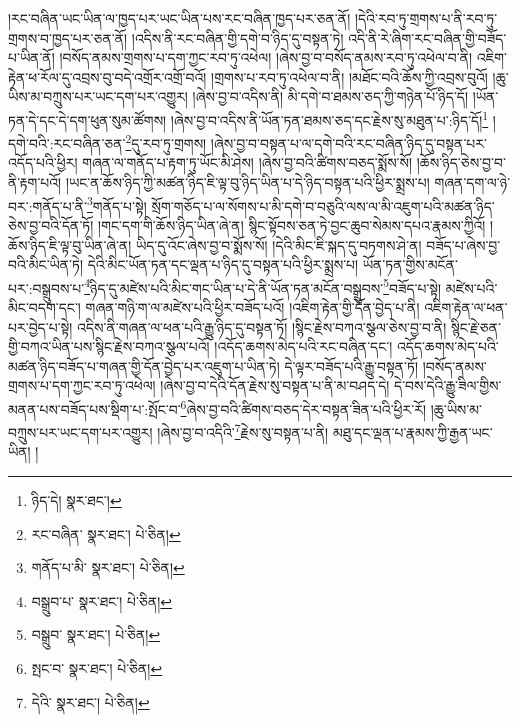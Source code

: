 །རང་བཞིན་ཡང་ཡིན་ལ་ཁྱད་པར་ཡང་ཡིན་པས་རང་བཞིན་ཁྱད་པར་ཅན་ནོ། །དེའི་རབ་ཏུ་གྲགས་པ་ནི་རབ་ཏུ་གྲགས་བ་ཁྱད་པར་ཅན་ནོ། །འདིས་ནི་རང་བཞིན་གྱི་དགེ་བ་ཉིད་དུ་བསྟན་ཏེ། འདི་ནི་རེ་ཞིག་རང་བཞིན་གྱི་བཟོད་པ་ཡིན་ནོ། །བསོད་ནམས་གྲགས་པ་དག་ཀྱང་རབ་ཏུ་འཕེལ། །ཞེས་བྱ་བ་བསོད་ནམས་རབ་ཏུ་འཕེལ་བ་ནི། འཇིག་རྟེན་ཕ་རོལ་དུ་འབྲས་བུ་བདེ་འགྲོར་འགྲོ་བའོ། །གྲགས་པ་རབ་ཏུ་འཕེལ་བ་ནི། །མཐོང་བའི་ཆོས་ཀྱི་འབྲས་བུའོ། །ཆུ་ཡིས་མ་བཀྲུས་པར་ཡང་དག་པར་འགྱུར། །ཞེས་བྱ་བ་འདིས་ནི། མི་དགེ་བ་ཐམས་ཅད་ཀྱི་གཉེན་པོ་ཉིད་དོ། །ཡོན་ཏན་དེ་དང་དེ་དག་ཕུན་སུམ་ཚོགས། །ཞེས་བྱ་བ་འདིས་ནི་ཡོན་ཏན་ཐམས་ཅད་དང་རྗེས་སུ་མཐུན་པ་:ཉིད་དོ།\footnote{ཉིད་དེ།  སྣར་ཐང་། } །དགེ་བའི་:རང་བཞིན་ཅན་\footnote{རང་བཞིན་  སྣར་ཐང་།  པེ་ཅིན། }དུ་རབ་ཏུ་གྲགས། །ཞེས་བྱ་བ་བསྟན་པ་ལ་དགེ་བའི་རང་བཞིན་ཉིད་དུ་བསྟན་པར་འདོད་པའི་ཕྱིར། གཞན་ལ་གནོད་པ་རྟག་ཏུ་ཡོང་མི་ཤེས། །ཞེས་བྱ་བའི་ཚིགས་བཅད་སྨོས་སོ། །ཆོས་ཉིད་ཅེས་བྱ་བ་ནི་རྟག་པའོ། །ཡང་ན་ཆོས་ཉིད་ཀྱི་མཚན་ཉིད་ཇི་ལྟ་བུ་ཉིད་ཡིན་པ་དེ་ཉིད་བསྟན་པའི་ཕྱིར་སྨྲས་པ། གཞན་དག་ལ་ཉེ་བར་:གནོད་པ་ནི་\footnote{གནོད་པ་མི་  སྣར་ཐང་།  པེ་ཅིན། }གནོད་པ་སྟེ། སྲོག་གཅོད་པ་ལ་སོགས་པ་མི་དགེ་བ་བཅུའི་ལས་ལ་མི་འཇུག་པའི་མཚན་ཉིད་ཅེས་བྱ་བའི་དོན་ཏོ། །གང་དག་གི་ཆོས་ཉིད་ཡིན་ཞེ་ན། སྙིང་སྟོབས་ཅན་ཏེ་བྱང་ཆུབ་སེམས་དཔའ་རྣམས་ཀྱིའོ། །ཆོས་ཉིད་ཇི་ལྟ་བུ་ཡིན་ཞེ་ན། ཡིད་དུ་འོང་ཞེས་བྱ་བ་སྨོས་སོ། །དེའི་མིང་ཇི་སྐད་དུ་བཏགས་ཤེ་ན། བཟོད་པ་ཞེས་བྱ་བའི་མིང་ཡིན་ཏེ། དེའི་མིང་ཡོན་ཏན་དང་ལྡན་པ་ཉིད་དུ་བསྟན་པའི་ཕྱིར་སྨྲས་པ། ཡོན་ཏན་གྱིས་མངོན་པར་:བསྒྲུབས་པ་\footnote{བསྒྲུབ་པ་  སྣར་ཐང་།  པེ་ཅིན། }ཉིད་དུ་མཛེས་པའི་མིང་གང་ཡིན་པ་དེ་ནི་ཡོན་ཏན་མངོན་བསྒྲུབས་\footnote{བསྒྲུབ་  སྣར་ཐང་།  པེ་ཅིན། }བཟོད་པ་སྟེ། མཛེས་པའི་མིང་བདག་དང་། གཞན་གཉི་ག་ལ་མཛེས་པའི་ཕྱིར་བཟོད་པའོ། །འཇིག་རྟེན་གྱི་དོན་བྱེད་པ་ནི། འཇིག་རྟེན་ལ་ཕན་པར་བྱེད་པ་སྟེ། འདིས་ནི་གཞན་ལ་ཕན་པའི་རྒྱུ་ཉིད་དུ་བསྟན་ཏོ། །སྙིང་རྗེས་བཀའ་སྩལ་ཅེས་བྱ་བ་ནི། སྙིང་རྗེ་ཅན་གྱི་བཀའ་ཡིན་པས་སྙིང་རྗེས་བཀའ་སྩལ་པའོ། །འདོད་ཆགས་མེད་པའི་རང་བཞིན་དང་། འདོད་ཆགས་མེད་པའི་མཚན་ཉིད་བཟོད་པ་གཞན་གྱི་དོན་བྱེད་པར་འཇུག་པ་ཡིན་ཏེ། དེ་ལྟར་བཟོད་པའི་རྒྱུ་བསྟན་ཏོ། །བསོད་ནམས་གྲགས་པ་དག་ཀྱང་རབ་ཏུ་འཕེལ། །ཞེས་བྱ་བ་དེའི་དོན་རྗེས་སུ་བསྟན་པ་ནི་མ་བཤད་དེ། དེ་བས་དེའི་རྒྱུ་ཟིལ་གྱིས་མནན་པས་བཟོད་པས་སྡིག་པ་:སྤོང་བ་\footnote{སྤང་བ་  སྣར་ཐང་།  པེ་ཅིན། }ཞེས་བྱ་བའི་ཚིགས་བཅད་དེར་བསྟན་ཟིན་པའི་ཕྱིར་རོ། །ཆུ་ཡིས་མ་བཀྲུས་པར་ཡང་དག་པར་འགྱུར། །ཞེས་བྱ་བ་འདིའི་\footnote{དེའི་  སྣར་ཐང་།  པེ་ཅིན། }རྗེས་སུ་བསྟན་པ་ནི། མཐུ་དང་ལྡན་པ་རྣམས་ཀྱི་རྒྱན་ཡང་ཡིན། །
